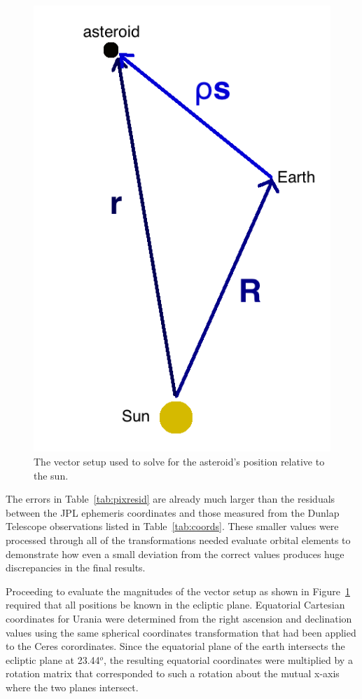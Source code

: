 \documentclass[a4paper,12pt]{article}
\begin{document}
\begin{figure}
\includegraphics[scale = 0.3]{vectors.png}
\caption{The vector setup used to solve for the asteroid's position relative to the sun.}
\label{fig:vectors}
\end{figure}

The errors in Table~\ref{tab:pixresid} are already much larger than the residuals between the JPL ephemeris coordinates and those measured from the Dunlap Telescope observations listed in Table~\ref{tab:coords}. These smaller values were processed through all of the transformations needed evaluate orbital elements to demonstrate how even a small deviation from the correct values produces huge discrepancies in the final results.

Proceeding to evaluate the magnitudes of the vector setup as shown in Figure~\ref{fig:vectors} required that all positions be known in the ecliptic plane. Equatorial Cartesian coordinates for Urania were determined from the right ascension and declination values using the same spherical coordinates transformation that had been applied to the Ceres corordinates. Since the equatorial plane of the earth intersects the ecliptic plane at 23.44$^o$, the resulting equatorial coordinates were multiplied by a rotation matrix that corresponded to such a rotation about the mutual x-axis where the two planes intersect.
\end{document}
